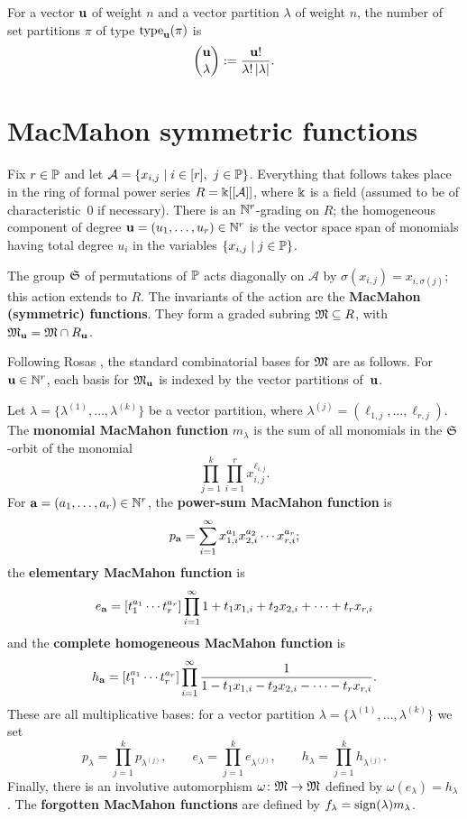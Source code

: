 For a vector $\uu$ of weight $n$ and a vector partition $\lambda$ of weight $n$, the number of set partitions $\pi$ of type $\type_\uu(\pi)$ is
\[\binom{\uu}{\lambda} := \frac{\uu!}{\lambda!\,|\lambda|}.\]

\section{MacMahon symmetric functions}

Fix $r\in\Pp$ and let $\mathcal{A}=\{x_{i,j} \mid i\in[r],\ j\in\Pp\}$.
Everything that follows takes place in the ring of formal power series $R=\fld[[\mathcal{A}]]$, where $\fld$ is a field (assumed to be of characteristic~0 if necessary).  There is an $\Nn^r$-grading on $R$; the homogeneous component of degree $\uu=(u_1,\dots,u_r)\in\Nn^r$ is the vector space span of monomials having total degree $u_i$ in the variables $\{x_{i,j}\mid j\in\Pp\}$.

The group $\Sym$ of permutations of $\Pp$ acts diagonally on $\mathcal{A}$ by $\sigma(x_{i,j})=x_{i,\sigma(j)}$; this action extends to $R$.  The invariants of the action are the \textbf{MacMahon (symmetric) functions}.  They form a graded subring $\Mac\subseteq R$, with $\Mac_\uu=\Mac\cap R_\uu$.

Following Rosas \cite{Rosas}, the standard combinatorial bases for $\Mac$ are as follows.  For $\uu\in\Nn^r$, each basis for $\Mac_\uu$ is indexed by the vector partitions of~$\uu$.

Let $\lambda=\{\lambda^{(1)},\dots,\lambda^{(k)}\}$ be a vector partition, where $\lambda^{(j)}=(\ell_{1,j},\dots,\ell_{r,j})$.
The \textbf{monomial MacMahon function} $m_\lambda$ is the sum of all monomials in the $\Sym$-orbit of the monomial
\[\prod_{j=1}^k \prod_{i=1}^r x_{i,j}^{\ell_{i,j}}.\]
For $\aa=(a_1,\dots,a_r)\in\Nn^r$, the \textbf{power-sum MacMahon function} is
\[p_\aa = \sum_{i=1}^\infty x_{1,i}^{a_1} x_{2,i}^{a_2} \cdots x_{r,i}^{a_r};\]
the \textbf{elementary MacMahon function} is
\[e_\aa = [t_1^{a_1}\cdots t_r^{a_r}] \prod_{i=1}^\infty 1+t_1x_{1,i}+t_2x_{2,i}+\cdots+t_rx_{r,i}\]
and the \textbf{complete homogeneous MacMahon function} is
\[h_\aa = [t_1^{a_1}\cdots t_r^{a_r}] \prod_{i=1}^\infty \frac{1}{1-t_1x_{1,i}-t_2x_{2,i}-\cdots-t_rx_{r,i}}.\]
These are all multiplicative bases:  for a vector partition $\lambda=\{\lambda^{(1)},\dots,\lambda^{(k)}\}$ we set
\[p_\lambda = \prod_{j=1}^k p_{\lambda^{(j)}},\qquad
e_\lambda = \prod_{j=1}^k e_{\lambda^{(j)}},\qquad
h_\lambda = \prod_{j=1}^k h_{\lambda^{(j)}}.\]
Finally, there is an involutive automorphism $\omega\colon\Mac\to\Mac$ defined by $\omega(e_\lambda)=h_\lambda$.
The \textbf{forgotten MacMahon functions} are defined by $f_\lambda=\sign(\lambda)m_\lambda$.

